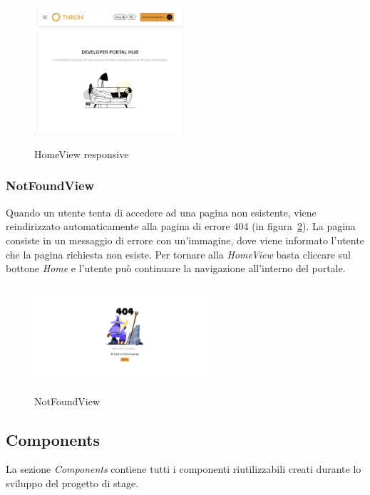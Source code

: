 \begin{figure}[ht]
  \centering
  \includegraphics[width=0.5\textwidth, alt={Pagina principale responsive dell'applicazione}]{images/frontend/HomeViewRes.jpg}
  \caption{HomeView responsive}\label{fig:home-view-responsive}
\end{figure}
\pagebreak

\subsubsection{NotFoundView}\label{subsubsec:not-found-view}
Quando un utente tenta di accedere ad una pagina non esistente, viene reindirizzato automaticamente alla pagina di errore 404 (in figura~\ref{fig:not-found-view}).
La pagina consiste in un messaggio di errore con un'immagine, dove viene informato l'utente che la pagina richiesta non esiste.
Per tornare alla \textit{HomeView} basta cliccare sul bottone \textit{Home} e l'utente può continuare la navigazione all'interno del portale.

\begin{figure}[ht]
  \centering
  \includegraphics[width=0.6\textwidth, alt={Pagina di errore 404}]{images/frontend/NotFoundView.jpg}
  \caption{NotFoundView}\label{fig:not-found-view}
\end{figure}
\pagebreak
\subsection{Components}\label{subsec:components}
La sezione \textit{Components} contiene tutti i componenti riutilizzabili creati durante lo sviluppo del progetto di stage.
